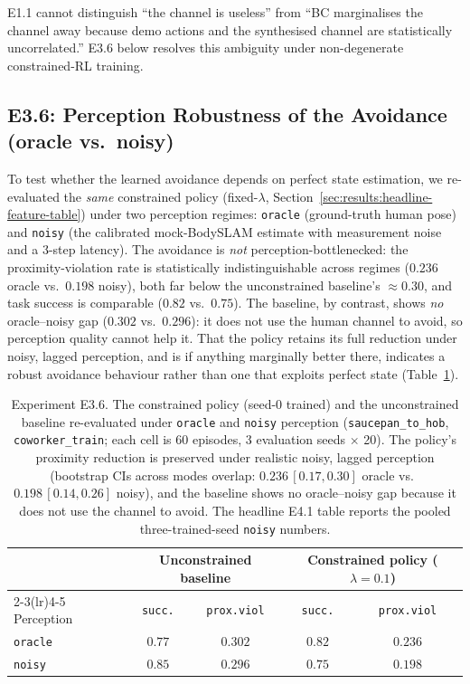 \documentclass[11pt,a4paper]{report}
\newcommand{\bodyslampp}{BodySLAM\nolinebreak[4]\hspace{-.05em}\raisebox{.2ex}{\scriptsize ++}}
\begin{document}
E1.1 cannot distinguish ``the channel is useless'' from ``BC
marginalises the channel away because demo actions and the
synthesised channel are statistically uncorrelated.'' E3.6 below
resolves this ambiguity under non-degenerate constrained-RL
training.

\subsection{E3.6: Perception Robustness of the Avoidance (oracle vs.\ noisy)}
\label{sec:results:obs-rl}

To test whether the learned avoidance depends on perfect state
estimation, we re-evaluated the \emph{same} constrained policy
(fixed-$\lambda$, Section~\ref{sec:results:headline-feature-table})
under two perception regimes: \texttt{oracle} (ground-truth human
pose) and \texttt{noisy} (the calibrated mock-\bodyslampp{} estimate
with measurement noise and a 3-step latency). The avoidance is
\emph{not} perception-bottlenecked: the proximity-violation rate is
statistically indistinguishable across regimes ($0.236$ oracle vs.\
$0.198$ noisy), both far below the unconstrained baseline's
$\approx$0.30, and task success is comparable ($0.82$ vs.\ $0.75$).
The baseline, by contrast, shows \emph{no} oracle--noisy gap ($0.302$
vs.\ $0.296$): it does not use the human channel to avoid, so
perception quality cannot help it. That the policy retains its full
reduction under noisy, lagged perception, and is if anything
marginally better there, indicates a robust avoidance behaviour
rather than one that exploits perfect state
(Table~\ref{tab:e3.6-obs-rl}).

\begin{table}[h]
\centering
\caption{Experiment E3.6. The constrained policy (seed-0 trained)
and the unconstrained baseline re-evaluated under \texttt{oracle} and
\texttt{noisy} perception (\texttt{saucepan\_to\_hob},
\texttt{coworker\_train}; each cell is 60 episodes, 3 evaluation
seeds $\times$ 20). The policy's proximity reduction is preserved
under realistic noisy, lagged perception (bootstrap CIs across modes
overlap: $0.236\,[0.17, 0.30]$ oracle vs.\ $0.198\,[0.14, 0.26]$
noisy), and the baseline shows no oracle--noisy gap because it does
not use the channel to avoid. The headline E4.1 table reports the
pooled three-trained-seed \texttt{noisy} numbers.}
\label{tab:e3.6-obs-rl}
\small
\begin{tabular}{lcccc}
\toprule
 & \multicolumn{2}{c}{Unconstrained baseline} & \multicolumn{2}{c}{Constrained policy ($\lambda{=}0.1$)} \\
\cmidrule(lr){2-3}\cmidrule(lr){4-5}
Perception & \texttt{succ.} & \texttt{prox.viol} & \texttt{succ.} & \texttt{prox.viol} \\
\midrule
\texttt{oracle} & $0.77$ & $0.302$ & $0.82$ & $0.236$ \\
\texttt{noisy}  & $0.85$ & $0.296$ & $0.75$ & $0.198$ \\
\bottomrule
\end{tabular}
\end{table}
\end{document}
